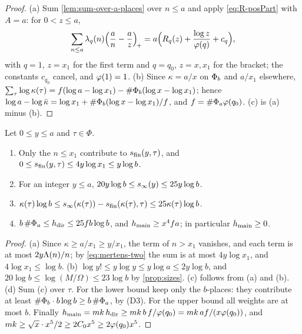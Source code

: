 \begin{proof}
(a) Sum \cref{lem:sum-over-a-places} over $n\le a$ and apply \eqref{eq:R-posPart} with $A=a$: for
$0<z\le a$,
\[
  \sum_{n\le a}\lambda_q(n)\Bigl(\frac an-\frac az\Bigr)_{\!+}
  =a\Bigl(R_q(z)+\frac{\log z}{\varphi(q)}+c_q\Bigr),
\]
with $q=1$, $z=x_1$ for the first term and $q=q_0$, $z=x,x_1$ for the bracket; the constants
$c_{q_0}$ cancel, and $\varphi(1)=1$. (b) Since $\kappa=a/x$ on $\Phi_b$ and $a/x_1$ elsewhere,
$\sum_\tau\log\kappa(\tau)=f(\log a-\log x_1)-\#\Phi_b(\log x-\log x_1)$; hence
$\log a-\log\bar\kappa=\log x_1+\#\Phi_b(\log x-\log x_1)/f$, and $f=\#\Phi_a\varphi(q_0)$. (c) is (a)
minus (b).
\end{proof}

\begin{lemma}\label{lem:prime-sum-bounds}
Let $0\le y\le a$ and $\tau\in\Phi$.
\begin{enumerate}[label=\textup{(\alph*)}]
\item Only the $n\le x_1$ contribute to $s_{\mathrm{fin}}(y,\tau)$, and $0\le s_{\mathrm{fin}}(y,\tau)\le4y\log x_1\le y\log b$.
\item For an integer $y\le a$, $20y\log b\le s_\infty(y)\le25y\log b$.
\item $\kappa(\tau)\log b\le s_\infty(\kappa(\tau))-s_{\mathrm{fin}}(\kappa(\tau),\tau)\le25\kappa(\tau)\log b$.
\item $b\,\#\Phi_a\le h_{\mathrm{dir}}\le25fb\log b$, and $h_{\mathrm{main}}\ge x^4fa$; in particular $h_{\mathrm{main}}\ge0$.
\end{enumerate}
\end{lemma}

\begin{proof}
(a) Since $\kappa\ge a/x_1\ge y/x_1$, the term of $n>x_1$ vanishes, and each term is at most
$2y\Lambda(n)/n$; by \eqref{eq:mertens-two} the sum is at most $4y\log x_1$, and $4\log x_1\le\log b$.
(b) $\log y!\le y\log y\le y\log a\le2y\log b$, and $20\log b\le\log(M/\Omega)\le23\log b$ by
\cref{prop:sizes}. (c) follows from (a) and (b). (d) Sum (c) over $\tau$. For the lower bound keep
only the $b$-places: they contribute at least $\#\Phi_b\cdot b\log b\ge b\,\#\Phi_a$, by (D3). For the
upper bound all weights are at most $b$. Finally
$h_{\mathrm{main}}=mk\,h_{\mathrm{dir}}\ge mk\,b\,f/\varphi(q_0)=mk\,af/(x\varphi(q_0))$, and
$mk\ge\sqrt x\cdot x^5/2\ge2C_0x^5\ge2\varphi(q_0)x^5$.
\end{proof}

